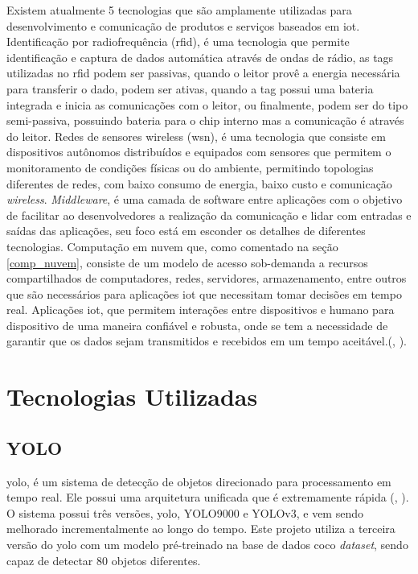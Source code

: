 \documentclass[]{politex}
\begin{document}
Existem atualmente 5 tecnologias que são amplamente utilizadas para desenvolvimento e comunicação de produtos e serviços baseados em \acrshort{iot}. Identificação por radiofrequência (\acrfull{rfid}), é uma tecnologia que permite identificação e captura de dados automática através de ondas de rádio, as tags utilizadas no \acrshort{rfid} podem ser passivas, quando o leitor provê a energia necessária para transferir o dado, podem ser ativas, quando a tag possui uma bateria integrada e inicia as comunicações com o leitor, ou finalmente, podem ser do tipo semi-passiva, possuindo bateria para o chip interno mas a comunicação é através do leitor. Redes de sensores wireless (\acrfull{wsn}), é uma tecnologia que consiste em dispositivos autônomos distribuídos e equipados com sensores que permitem o monitoramento de condições físicas ou do ambiente, permitindo topologias diferentes de redes, com baixo consumo de energia, baixo custo e comunicação \textit{wireless}. \textit{Middleware}, é uma camada de software entre aplicações com o objetivo de facilitar ao desenvolvedores a realização da comunicação e lidar com entradas e saídas das aplicações, seu foco está em esconder os detalhes de diferentes tecnologias. Computação em nuvem que, como comentado na seção \ref{comp_nuvem}, consiste de um modelo de acesso sob-demanda a recursos compartilhados de computadores, redes, servidores, armazenamento, entre outros que são necessários para aplicações \acrshort{iot} que necessitam tomar decisões em tempo real. Aplicações \acrshort{iot}, que permitem interações entre dispositivos e humano para dispositivo de uma maneira confiável e robusta, onde se tem a necessidade de garantir que os dados sejam transmitidos e recebidos em um tempo aceitável.(, \citeyear{iot_lee}).


\chapter{Tecnologias Utilizadas}
\section{YOLO} \label{yolo}
\acrfull{yolo}, é um sistema de detecção de objetos direcionado para processamento em tempo real. Ele possui uma arquitetura unificada que é extremamente rápida (, \citeyear{yolov1}). O sistema possui três versões, \acrshort{yolo}, YOLO9000 e YOLOv3, e vem sendo melhorado incrementalmente ao longo do tempo. Este projeto utiliza a terceira versão do \acrshort{yolo} com um modelo pré-treinado na base de dados \acrshort{coco} \textit{dataset}, sendo capaz de detectar 80 objetos diferentes.
\end{document}
